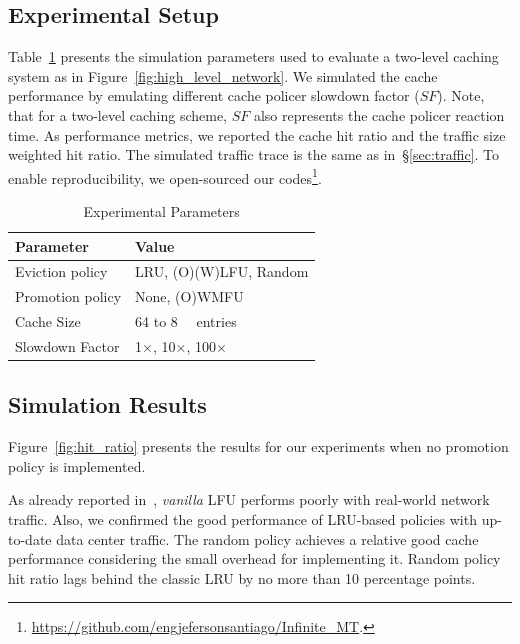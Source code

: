 \subsection{Experimental Setup}
Table~\ref{tab:setup} presents the simulation parameters used to evaluate a two-level caching system as in Figure~\ref{fig:high_level_network}.
We simulated the cache performance by emulating different cache policer slowdown factor ($SF$).
Note, that for a two-level caching scheme, $SF$ also represents the cache policer reaction time.
As performance metrics, we reported the cache hit ratio and the traffic size weighted hit ratio.
The simulated traffic trace is the same as in~\S\ref{sec:traffic}.
To enable reproducibility, we open-sourced our codes\footnote{\url{https://github.com/engjefersonsantiago/Infinite_MT}.}.


\begin{table}[h]
	\centering
	\caption{Experimental Parameters}
	\label{tab:setup}
	\begin{tabular}{l|l}
		\toprule
		\textbf{Parameter}       & \textbf{Value}   \\
		\midrule
		Eviction policy            & LRU, (O)(W)LFU, Random			    \\
		Promotion policy            & None, (O)WMFU			    \\
		Cache Size              & 64 to \SI{8}{\kilo\nothing} entries  \\
		Slowdown Factor         & 1$\times$, 10$\times$, 100$\times$        \\
		\bottomrule
	\end{tabular}
\end{table}

\subsection{Simulation Results}
Figure~\ref{fig:hit_ratio} presents the results for our experiments when no promotion policy is implemented.

As already reported in~\cite{Kim:09}, \textit{vanilla} LFU performs poorly with real-world network traffic.
Also, we confirmed the good performance of LRU-based policies with up-to-date data center traffic. 
The random policy achieves a relative good cache performance considering the small overhead for implementing it.
Random policy hit ratio lags behind the classic LRU by no more than 10 percentage points.

